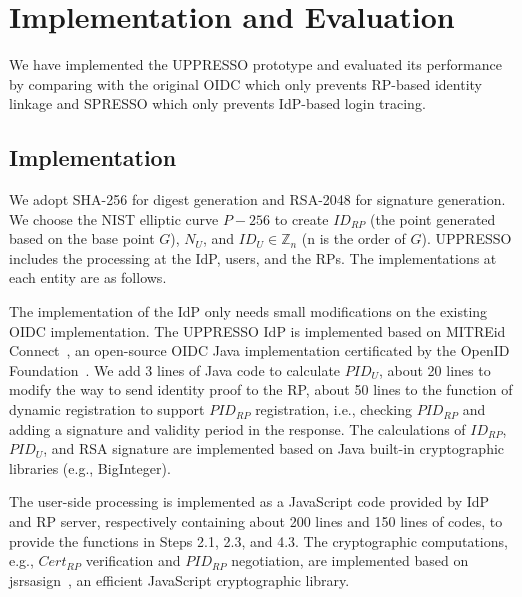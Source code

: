 \section{Implementation and Evaluation}
\label{sec:implementation}
We have implemented the UPPRESSO prototype and evaluated its performance by comparing with the original OIDC which only prevents RP-based identity linkage and SPRESSO which only prevents IdP-based login tracing.

\subsection{Implementation}
We adopt SHA-256 for digest generation and  RSA-2048 for signature generation. %
We choose the NIST elliptic curve $P-256$ to create $ID_{RP}$ (the point generated based on the base point $G$), $N_U$, and $ID_U \in \mathbb{Z}_n$ (n is the order of $G$).
UPPRESSO includes the processing at the IdP, users, and the RPs.
The implementations at each entity are as follows.

The implementation of the IdP only needs small modifications on the existing OIDC implementation.
The UPPRESSO IdP is implemented based on MITREid Connect~\cite{MITREid}, an open-source OIDC Java implementation certificated by the OpenID Foundation~\cite{OIDF}.
We add 3 lines of Java code to calculate $PID_U$, about 20 lines to modify the way to send identity proof to the RP,
about 50 lines to the function of dynamic registration to support $PID_{RP}$ registration,
 i.e., checking $PID_{RP}$ and adding a signature and validity period in the response.  %
The calculations of $ID_{RP}$, $PID_U$, and RSA signature are implemented based on Java built-in cryptographic libraries (e.g., BigInteger).

The user-side processing is implemented as a JavaScript code provided by IdP and RP server, respectively containing about 200 lines and 150 lines of codes,
to provide the functions in Steps 2.1, 2.3, and 4.3.
The cryptographic computations, e.g., $Cert_{RP}$ verification and $PID_{RP}$ negotiation, are implemented based on jsrsasign~\cite{jsrsasign}, an efficient JavaScript cryptographic library.

